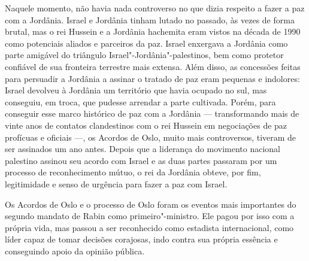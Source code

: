 
Naquele momento, não havia nada controverso no que dizia respeito a
fazer a paz com a Jordânia. Israel e Jordânia tinham lutado no passado,
às vezes de forma brutal, mas o rei Hussein e a Jordânia hachemita eram
vistos na década de 1990 como potenciais aliados e parceiros da paz.
Israel enxergava a Jordânia como parte amigável do triângulo
Israel"-Jordânia"-palestinos, bem como protetor confiável de sua fronteira
terrestre mais extensa. Além disso, as concessões feitas para persuadir
a Jordânia a assinar o tratado de paz eram pequenas e indolores: Israel
devolveu à Jordânia um território que havia ocupado no sul, mas
conseguiu, em troca, que pudesse arrendar a parte cultivada. Porém, para
conseguir esse marco histórico de paz com a Jordânia --- transformando
mais de vinte anos de contatos clandestinos com o rei Hussein em
negociações de paz profícuas e oficiais ---, os Acordos de Oslo, muito
mais controversos, tiveram de ser assinados um ano antes. Depois que a
liderança do movimento nacional palestino assinou seu acordo com Israel
e as duas partes passaram por um processo de reconhecimento mútuo, o rei
da Jordânia obteve, por fim, legitimidade e senso de urgência para fazer a
paz com Israel.

Os Acordos de Oslo e o processo de Oslo foram os eventos mais
importantes do segundo mandato de Rabin como primeiro"-ministro. Ele
pagou por isso com a própria vida, mas passou a ser reconhecido como
estadista internacional, como líder capaz de tomar decisões corajosas,
indo contra sua própria essência e conseguindo apoio da opinião pública.


